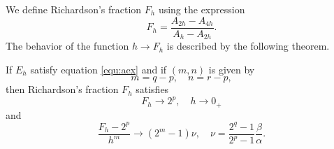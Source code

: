 \documentclass[runningheads]{llncs}
\begin{document}
We define Richardson's fraction $F_h$ using the expression
\begin{equation}
  F_h = \frac{A_{2h} - A_{4h}}{A_h - A_{2h}}.
\end{equation}
The behavior of the function $h \rightarrow F_h$ is described by the following theorem.
\begin{theorem} If $E_h$ satisfy equation \eqref{equ:aex} and if $(m,n)$ is given by
  \begin{equation}
    m = q - p, \quad n = r - p,
  \end{equation}
  then Richardson's fraction $F_h$ satisfies
  \begin{equation}
    F_h \rightarrow 2^p, \quad h \rightarrow 0_+
  \end{equation}
  and 
  \begin{equation}
    \frac{F_h - 2^p}{h^m} \rightarrow (2^m-1) \nu, \quad \nu = \frac{2^q-1}{2^p-1} \frac{\beta}{\alpha}.
    \end{equation}
\end{theorem}
\end{document}
